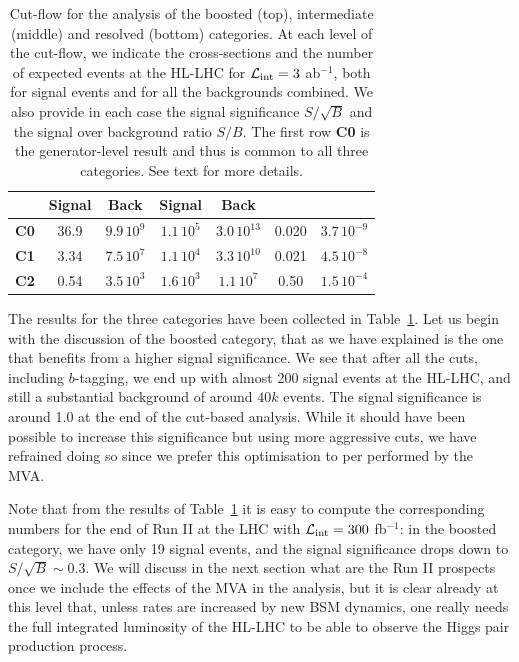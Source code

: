 \begin{table}[t]
\begin{tabular}{c|c|c|c|c|c|c}
      &    Signal & Back   &  Signal  & Back
    &   & \\
    \hline
       {\bf C0}  &  36.9  & $9.9\,10^{9}$ & $1.1\,10^5$ & $3.0\,10^{13}$  &  0.020 & $3.7\,10^{-9}$\\
        {\bf C1}  &   3.34    & $7.5\,10^{7}$    & $1.1\,10^4$    & $3.3\,10^{10}$     & 0.021     & $4.5\,10^{-8}$  \\
        {\bf C2}  &   0.54    &  $3.5\,10^{3}$   &  $1.6\,10^{3}$   &   $1.1\,10^{7}$   & 0.50     &  $1.5\,10^{-4}$ \\
        \hline
  \end{tabular}
  \caption{\small Cut-flow for the analysis of the boosted (top),
    intermediate (middle) and resolved (bottom)
    categories.
    At each level of the cut-flow, we indicate the cross-sections and the number of
    expected events at the HL-LHC for $\mathcal{L}_{\rm int}=3$ ab$^{-1}$, both for
    signal events and for all the backgrounds combined.
    We also provide in each case the
    signal significance $S/\sqrt{B}$ and the signal
    over background ratio $S/B$.
    The first row {\bf C0} is the generator-level result and thus is common
    to all three categories.
    See text for more details.
    \label{table:cutflow}
  }
\end{table}


The results for the three categories have been collected in
Table~\ref{table:cutflow}.
%
Let us begin with the discussion of the boosted category, that as we have explained
is the one that benefits from a higher signal significance.
%
We see that after all the cuts, including $b$-tagging,
we end up with almost 200 signal events at the HL-LHC, and
still a substantial background of around $40k$ events.
%
The signal significance is around 1.0 at the end of the
cut-based analysis.
%
While it should have been possible to increase this significance
but using more aggressive cuts, we have refrained doing so
since we prefer this optimisation to per performed by
the MVA.


Note that from the results of Table~\ref{table:cutflow}
it is easy to compute the corresponding numbers
for the end of Run II at the LHC with
$\mathcal{L}_{\rm int}=300$ fb$^{-1}$: in the boosted category,
we have only
19 signal events, and the signal significance drops down to
$S/\sqrt{B}\sim 0.3$.
%
We will discuss in the next section what are the Run II prospects
once we include the effects of the MVA in the analysis, but
it is clear already at this level that, unless rates are
increased by new BSM dynamics, one really needs the full
integrated luminosity of the HL-LHC to be able to observe
the Higgs pair production process.

